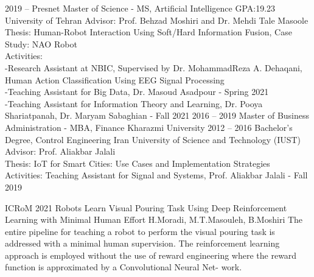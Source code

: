 \documentclass[9pt]{developercv} %
\begin{document}
\begin{entrylist}
	\entry
		{2019 -- Presnet}
		{Master of Science - MS, Artificial Intelligence GPA:19.23}
		{University of Tehran}
		{Advisor: Prof. Behzad Moshiri and Dr. Mehdi Tale Masoole
		\\Thesis: Human-Robot Interaction Using Soft/Hard Information Fusion, Case Study: NAO Robot
		\\Activities: 
		\\-Research Assistant at NBIC, Supervised by Dr. MohammadReza A. Dehaqani, Human Action Classification Using EEG Signal Processing
		\\-Teaching Assistant for Big Data, Dr. Masoud Asadpour - Spring 2021
		\\ -Teaching Assistant for Information Theory and Learning, Dr. Pooya Shariatpanah, Dr. Maryam
Sabaghian - Fall 2021
		}
	\entry
		{2016 -- 2019}
		{Master of Business Administration - MBA, Finance}
		{Kharazmi University}	
		{}
	\entry
		{2012 -- 2016}
		{Bachelor's Degree, Control Engineering}
		{Iran University of Science and Technology (IUST)}
		{Advisor: Prof. Aliakbar Jalali
		\\Thesis: IoT for Smart Cities: Use Cases and Implementation Strategies
		\\Activities: Teaching Assistant for Signal and Systems, Prof. Aliakbar Jalali - Fall 2019}
	
\end{entrylist}





\begin{entrylist}
	\entry
		{ICRoM 2021}
		{Robots Learn Visual Pouring Task Using Deep Reinforcement Learning with Minimal Human
Effort}
		{H.Moradi, M.T.Masouleh, B.Moshiri}	
		{The entire pipeline for teaching a robot to perform the visual pouring task is addressed with a
minimal human supervision. The reinforcement learning approach is employed without the use
of reward engineering where the reward function is approximated by a Convolutional Neural Net-
work.}
\end{entrylist}



\end{document}
